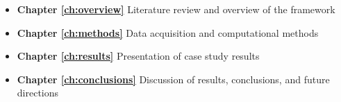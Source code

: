 \begin{itemize}


\item \textbf{Chapter \ref{ch:overview}} Literature review and overview of the framework

\item \textbf{Chapter \ref{ch:methods}} Data acquisition and computational methods

\item \textbf{Chapter \ref{ch:results}} Presentation of case study results

\item \textbf{Chapter \ref{ch:conclusions}} Discussion of results, conclusions, and future directions

\end{itemize}

